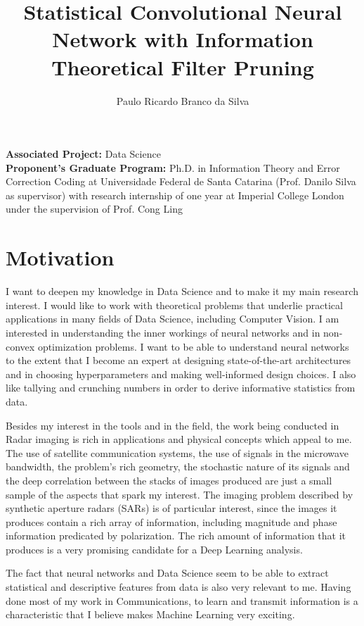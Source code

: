 \documentclass[12pt, a4paper]{article}
\title{\TitleFont \vspace{-5ex} Statistical Convolutional Neural Network with Information Theoretical Filter Pruning}
\author{\MyFont Paulo Ricardo Branco da Silva}
\date{}
\begin{document}
\maketitle

\noindent \textbf{Associated Project:} Data Science \\
\textbf{Proponent’s Graduate Program:} Ph.D. in Information Theory and Error Correction Coding at Universidade Federal de Santa Catarina (Prof. Danilo Silva as supervisor) with research internship of one year at Imperial College London under the supervision of Prof. Cong Ling\\

\section*{Motivation}
I want to deepen my knowledge in Data Science and to make it my main research interest. I would like to work with theoretical problems that underlie practical applications in many fields of Data Science, including Computer Vision. I am interested in understanding the inner workings of neural networks and in non-convex optimization problems. I want to be able to understand neural networks to the extent that I become an expert at designing state-of-the-art architectures and in choosing hyperparameters and making well-informed design choices. I also like tallying and crunching numbers in order to  derive informative statistics from data.
	
Besides my interest in the tools and in the field, the work being conducted in Radar imaging is rich in applications and physical concepts which appeal to me. The use of satellite communication systems, the use of signals in the microwave bandwidth, the problem’s rich geometry, the stochastic nature of its signals and the deep correlation between the stacks of images produced are just a small sample of the aspects that spark my interest. The imaging problem described by synthetic aperture radars (SARs) is of particular interest, since the images it produces contain a rich array of information, including magnitude and phase information predicated by polarization. The rich amount of information that it produces is a very promising candidate for a Deep Learning analysis.
	
The fact that neural networks and Data Science seem to be able to extract statistical and descriptive features from data is also very relevant to me. Having done most of my work in Communications, to learn and transmit information is a characteristic that I believe makes Machine Learning very exciting. 
\end{document}
